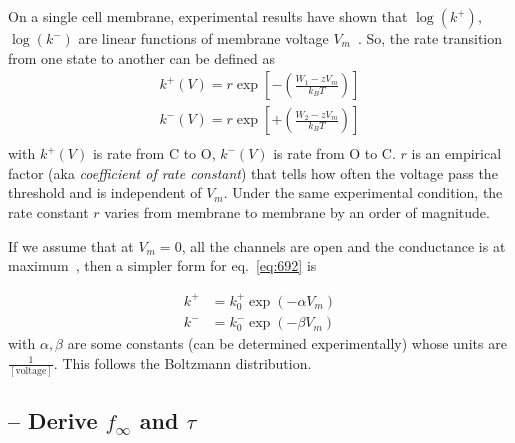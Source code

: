 On a single cell membrane, experimental results have shown that
$\log(k^+)$, $\log(k^-)$ are linear functions of membrane voltage
$V_m$~\citep{ehrenstein1974koa}. So, the rate transition from one state to
another can be defined as
\begin{equation}
  \label{eq:692}
  \begin{split}
    k^+(V) = r \exp[-(\frac{W_1-zV_m}{k_BT})] \\
    k^-(V) = r \exp[+(\frac{W_2-zV_m}{k_BT})] \\
  \end{split}
\end{equation}
with $k^+(V)$ is rate from C to O, $k^-(V)$ is rate from O to C.  $r$
is an empirical factor (aka {\it coefficient of rate constant}) that
tells how often the voltage pass the threshold and is independent of
$V_m$.  Under the same experimental condition, the rate constant $r$
varies from membrane to membrane by an order of magnitude.


If we assume that at $V_m=0$, all the
channels are open and the conductance is at
maximum~\citep{ehrenstein1970nnr}, then a simpler form for
eq.~\eqref{eq:692} is

\begin{equation}
  \label{eq:39}
  \begin{split}
    k^+ &= k_0^+ \exp(-\alpha V_m) \\
    k^- &= k_0^-  \exp(-\beta V_m)
  \end{split}
\end{equation}
with $\alpha, \beta$ are some constants (can be determined
experimentally) whose units are $\frac{1}{[\text{voltage}]}$. This
follows the Boltzmann distribution.

\subsection{-- Derive  $f_\infty$ and $\tau$}
\label{sec:analyze-f-tau}



